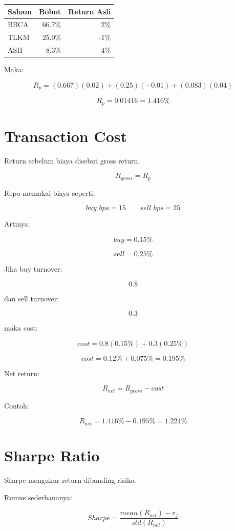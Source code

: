 \documentclass[11pt,a4paper]{article}
\begin{document}
\begin{center}
\begin{tabular}{lrr}
\toprule
Saham & Bobot & Return Asli \\
\midrule
BBCA & 66.7\% & 2\% \\
TLKM & 25.0\% & -1\% \\
ASII & 8.3\% & 4\% \\
\bottomrule
\end{tabular}
\end{center}

Maka:

\[
R_p =
(0.667)(0.02)
+
(0.25)(-0.01)
+
(0.083)(0.04)
\]

\[
R_p = 0.01416 = 1.416\%
\]

\section{Transaction Cost}

Return sebelum biaya disebut gross return.

\[
R_{gross} = R_p
\]

Repo memakai biaya seperti:

\[
buy\_bps = 15
\qquad
sell\_bps = 25
\]

Artinya:

\[
buy = 0.15\%
\]

\[
sell = 0.25\%
\]

Jika buy turnover:

\[
0.8
\]

dan sell turnover:

\[
0.3
\]

maka cost:

\[
cost = 0.8(0.15\%) + 0.3(0.25\%)
\]

\[
cost = 0.12\% + 0.075\% = 0.195\%
\]

Net return:

\[
\boxed{
R_{net} = R_{gross} - cost
}
\]

Contoh:

\[
R_{net} = 1.416\% - 0.195\% = 1.221\%
\]

\section{Sharpe Ratio}

Sharpe mengukur return dibanding risiko.

Rumus sederhananya:

\[
Sharpe =
\frac{
mean(R_{net}) - r_f
}{
std(R_{net})
}
\]
\end{document}

